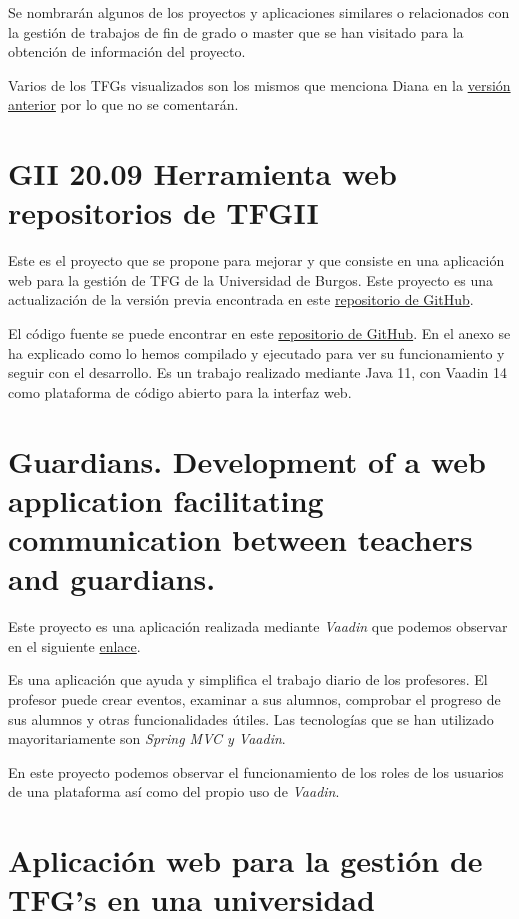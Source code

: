 Se nombrarán algunos de los proyectos y aplicaciones similares o relacionados con la gestión de trabajos de fin de grado o master que se han visitado para la obtención de información del proyecto.

Varios de los TFGs visualizados son los mismos que menciona Diana en la \href{https://github.com/dbo1001/Gestor-TFG-2021}{versión anterior} por lo que no se comentarán.  

\section{GII 20.09 Herramienta web repositorios de TFGII}
Este es el proyecto que se propone para mejorar y que consiste en una aplicación web para la gestión de TFG de la Universidad de Burgos. Este proyecto es una actualización de la versión previa encontrada en este \href{https://github.com/jfb0019/Gestor-TFG-2016}{repositorio de GitHub}. 

El código fuente se puede encontrar en este \href{https://github.com/dbo1001/Gestor-TFG-2021}{repositorio de GitHub}. En el anexo se ha explicado como lo hemos compilado y ejecutado para ver su funcionamiento y seguir con el desarrollo. Es un trabajo realizado mediante Java 11, con Vaadin 14 como plataforma de código abierto para la interfaz web. 

\section{Guardians. Development of a web application facilitating communication between teachers and guardians.}

Este proyecto es una aplicación realizada mediante \emph{Vaadin} que podemos observar en el siguiente \href{https://github.com/david-romero/tfg-vaadin}{enlace}.

Es una aplicación que ayuda y simplifica el trabajo diario de los profesores. El profesor puede crear eventos, examinar a sus alumnos, comprobar el progreso de sus alumnos y otras funcionalidades útiles. Las tecnologías que se han utilizado mayoritariamente son \emph{Spring MVC y Vaadin}.

En este proyecto podemos observar el funcionamiento de los roles de los usuarios de una plataforma así como del propio uso de \emph{Vaadin}.

\section{Aplicación web para la gestión de TFG's en una universidad}

